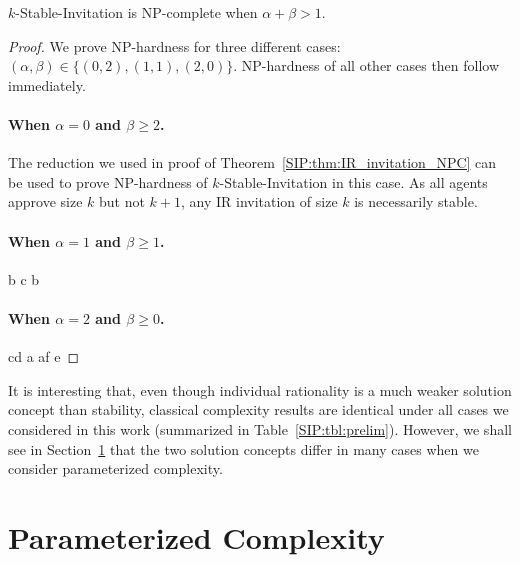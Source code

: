 \begin{theorem} \label{SIP:thm:stable_invitation_NPC}
	$k$-Stable-Invitation is NP-complete when $\alpha + \beta > 1$.
\end{theorem} 
\begin{proof} 
We prove NP-hardness for three different cases: $(\alpha,\beta) \in\{(0,2), (1,1), (2,0)\}$. NP-hardness of all other cases then follow immediately. 

\paragraph{When $\alpha = 0$ and $\beta \geq 2$.} 
The reduction we used in proof of Theorem~\ref{SIP:thm:IR_invitation_NPC} can be used to prove NP-hardness of $k$-Stable-Invitation in this case. As all agents approve size $k$ but not $k+1$, any IR invitation of size $k$ is necessarily stable.


\paragraph{When $\alpha = 1$ and $\beta \geq 1$.} %
b
c
b

\paragraph{When $\alpha = 2$ and $\beta \geq 0$.} %
cd
a
af
e


\end{proof}

It is interesting that, even though individual rationality is a much weaker solution concept than stability, classical complexity results are identical under all cases we considered in this work (summarized in Table~\ref{SIP:tbl:prelim}). However, we shall see in Section~\ref{SIP:sec:results} that the two solution concepts differ in many cases when we consider parameterized complexity. 




\section{Parameterized Complexity} \label{SIP:sec:results}

